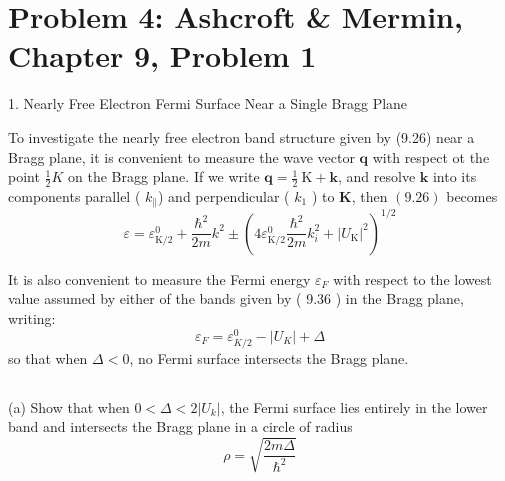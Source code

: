 \documentclass[12pt]{article}
\begin{document}
\section{Problem 4: Ashcroft \& Mermin, Chapter 9, Problem 1}
1. Nearly Free Electron Fermi Surface Near a Single Bragg Plane

To investigate the nearly free electron band structure given by (9.26) near a Bragg plane, it is convenient to measure the wave vector $\mathbf{q}$ with respect ot the point $\frac{1}{2} K$ on the Bragg plane. If we write $\mathbf{q}=\frac{1}{2} \mathrm{~K}+\mathbf{k}$, and resolve $\mathbf{k}$ into its components parallel ( $k_{\|}$) and perpendicular ( $k_1$ ) to $\mathbf{K}$, then $(9.26)$ becomes
$$
\varepsilon=\varepsilon_{\mathrm{K} / 2}^0+\frac{\hbar^2}{2 m} k^2 \pm\left(4 \varepsilon_{\mathrm{K} / 2}^0 \frac{\hbar^2}{2 m} k_i^2+\left|U_{\mathrm{K}}\right|^2\right)^{1 / 2}
$$

It is also convenient to measure the Fermi energy $\varepsilon_F$ with respect to the lowest value assumed by either of the bands given by ( 9.36 ) in the Bragg plane, writing:
$$
\varepsilon_F=\varepsilon_{K / 2}^0-\left|U_K\right|+\Delta
$$
so that when $\Delta<0$, no Fermi surface intersects the Bragg plane.
\subsection{}
(a) Show that when $0<\Delta<2\left|U_k\right|$, the Fermi surface lies entirely in the lower band and intersects the Bragg plane in a circle of radius
$$
\rho=\sqrt{\frac{2 m \Delta}{\hbar^2}}
$$
\end{document}
